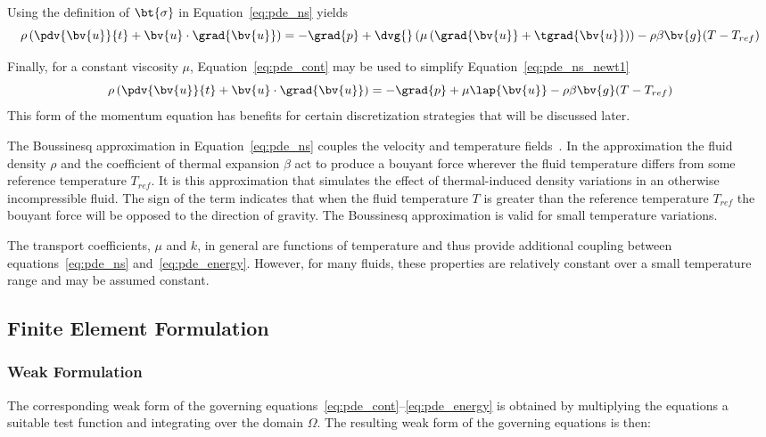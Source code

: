 Using the definition of $\bt{\sigma}$ in Equation~\eqref{eq:pde_ns} yields
\begin{equation}
  \label{eq:pde_ns_newt1}
  \rho\left(\pdv{\bv{u}}{t} + \bv{u}\cdot\grad{\bv{u}}\right) = -\grad{p} + \dvg{}\left(\mu\left(\grad{\bv{u}} + \tgrad{\bv{u}}\right)\right) -\rho\beta\bv{g}(T-T_{ref})
\end{equation}

Finally, for a constant viscosity $\mu$, Equation~\eqref{eq:pde_cont} may be used to simplify Equation~\eqref{eq:pde_ns_newt1}
\begin{equation}
  \label{eq:pde_ns_newt2}
  \rho\left(\pdv{\bv{u}}{t} + \bv{u}\cdot\grad{\bv{u}}\right) = -\grad{p} + \mu \lap{\bv{u}} - \rho\beta\bv{g}(T-T_{ref})
\end{equation}
This form of the momentum equation has benefits for certain discretization strategies that will be discussed later.

The Boussinesq approximation in Equation~\eqref{eq:pde_ns} couples the velocity and temperature fields~\cite{Bous-1903}. In the approximation the fluid density $\rho$ and the coefficient of thermal expansion $\beta$ act to produce a bouyant force wherever the fluid temperature differs from some reference temperature $T_{ref}$.  It is this approximation that simulates the effect of thermal-induced density variations in an otherwise incompressible fluid.  The sign of the term indicates that when the fluid temperature $T$ is greater than the reference temperature $T_{ref}$ the bouyant force will be opposed to the direction of gravity.  The Boussinesq approximation is valid for small temperature variations.

The transport coefficients, $\mu$ and $k$, in general are functions of temperature and thus provide additional coupling between equations~\eqref{eq:pde_ns} and~\eqref{eq:pde_energy}.  However, for many fluids, these properties are relatively constant over a small temperature range and may be assumed constant.  

\subsection{Finite Element Formulation}
\subsubsection{Weak Formulation}
The corresponding weak form of the governing equations~\eqref{eq:pde_cont}--\eqref{eq:pde_energy} is obtained by multiplying the equations a suitable test function and integrating over the domain $\Omega$. The resulting weak form of the governing equations is then:
\\

